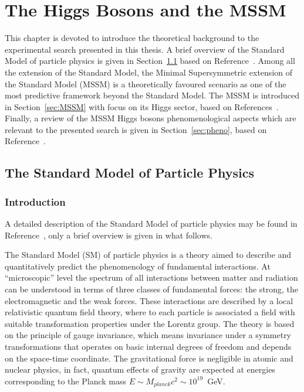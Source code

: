 
\chapter{The Higgs Bosons and the MSSM} \label{chap:theory}

 \vspace{2cm}

This chapter is devoted to introduce the theoretical background to the experimental search presented in this thesis.
A brief overview of the Standard Model of particle physics is given in Section~\ref{sec:SM} based on Reference~\cite{Altarelli}. 
Among all the extension of the Standard Model, the Minimal Supersymmetric 
extension of the Standard Model (MSSM) is a theoretically favoured scenario as one of the most predictive
framework beyond the Standard Model. The MSSM is introduced in Section~\ref{sec:MSSM} with focus on its Higgs sector, based on 
References~\cite{SusyPrimer,Djuadi}.
Finally, a review of the MSSM Higgs bosons phenomenological aspects which are relevant to the presented search is given 
in Section~\ref{sec:pheno}, based on Reference~\cite{LHCxsec}.

\restoregeometry

\clearpage

\section{The Standard Model of Particle Physics} \label{sec:SM}
\subsection{Introduction}
A detailed description of the Standard Model of particle physics may be found in Reference~\cite{Peskin}, only a brief overview is
given in what follows.

The Standard Model (SM) of particle physics is a theory aimed to describe and quantitatively predict
the phenomenology of fundamental interactions. At ``microscopic''  level the spectrum of all interactions between matter and 
radiation can be understood in terms of three classes of fundamental forces: the strong, the electromagnetic
and the weak forces. These interactions are described by a local relativistic quantum field theory, where to each particle
is associated a field with suitable transformation properties under the Lorentz group.
The theory is based on the principle of gauge invariance, which means invariance under  a symmetry  transformations    
that operates on basic internal degrees of freedom and depends on the space-time coordinate.
The gravitational force is negligible in atomic and nuclear physics, in fact,
quantum effects of gravity are expected at energies corresponding to the Planck mass $E \sim M_{planck} c^2 \sim 10^{19}$~GeV.

